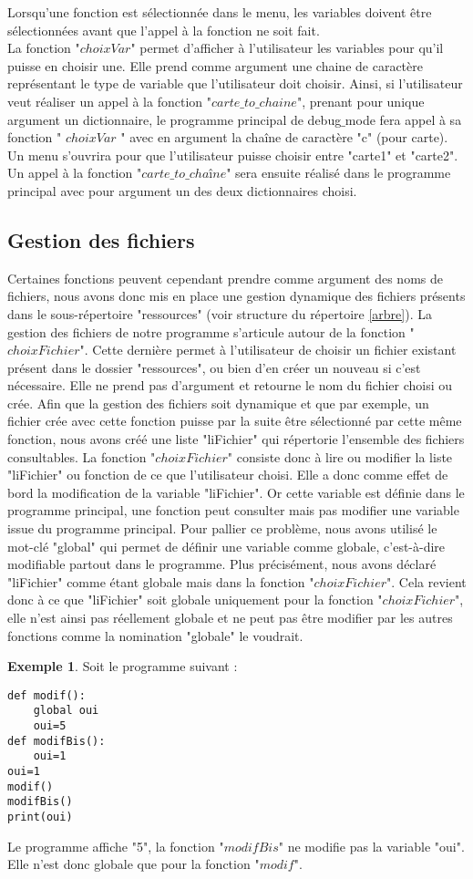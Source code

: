 \documentclass[10pt,a4paper,french,titlepage]{article}
\theoremstyle{definition}
\newtheorem{exmp}{Exemple}
\begin{document}
Lorsqu'une fonction est sélectionnée dans le menu, les variables doivent être sélectionnées avant que l'appel à la fonction ne soit fait.\\ La fonction "$choixVar$" permet d'afficher à l'utilisateur les variables pour qu'il puisse en choisir une. Elle prend comme argument une chaine de caractère représentant le type de variable
que l'utilisateur doit choisir. Ainsi, si l'utilisateur veut réaliser un appel à la fonction "$carte\_to\_chaine$", prenant pour unique argument un dictionnaire, le programme principal de debug$\_$mode fera appel à sa fonction  " $choixVar$ " avec en argument la chaîne de caractère "c" (pour carte). Un menu s'ouvrira pour que l'utilisateur puisse choisir entre "carte1" et "carte2". Un appel à la fonction "$carte\_to\_chaîne$" sera ensuite réalisé dans le programme principal avec pour argument un des deux dictionnaires choisi.

\subsection{Gestion des fichiers}
Certaines fonctions peuvent cependant prendre comme argument des noms de fichiers, nous avons donc mis en place une gestion dynamique des fichiers présents dans le sous-répertoire "ressources" (voir structure du répertoire \ref{arbre}). La gestion des fichiers de notre programme s'articule autour de la fonction "$choixFichier$". Cette dernière permet à l'utilisateur de choisir un fichier existant présent dans le dossier "ressources", ou bien d'en créer un nouveau si c'est nécessaire. Elle ne prend pas d'argument et retourne le nom du fichier choisi ou crée. Afin que la gestion des fichiers soit dynamique et que par exemple, un fichier crée avec cette fonction puisse par la suite être sélectionné par cette même fonction, nous avons créé une liste "liFichier" qui répertorie l'ensemble des fichiers consultables. La fonction "$choixFichier$" consiste donc à lire ou modifier la liste "liFichier" ou fonction de ce que l'utilisateur choisi. Elle a donc comme effet de bord la modification de la variable "liFichier". Or cette variable est définie dans le programme principal, une fonction peut consulter mais pas modifier une variable issue du programme principal. Pour pallier ce problème, nous avons utilisé le mot-clé "global" qui permet de définir une variable comme globale, c’est-à-dire modifiable partout dans le programme. Plus précisément, nous avons déclaré "liFichier" comme étant globale mais dans la fonction "$choixFichier$". Cela revient donc à ce que "liFichier" soit globale uniquement pour la fonction "$choixFichier$", elle n'est ainsi pas réellement globale et ne peut pas être modifier par les autres fonctions comme la nomination "globale" le voudrait.
\begin{exmp}
Soit le programme suivant :
\begin{lstlisting}
def modif():
    global oui
    oui=5
def modifBis():
    oui=1
oui=1
modif()
modifBis()
print(oui)
\end{lstlisting}
Le programme affiche "5", la fonction "$modifBis$" ne modifie pas la variable "oui". Elle n'est donc globale que pour la fonction "$modif$".
\end{exmp}
\end{document}
